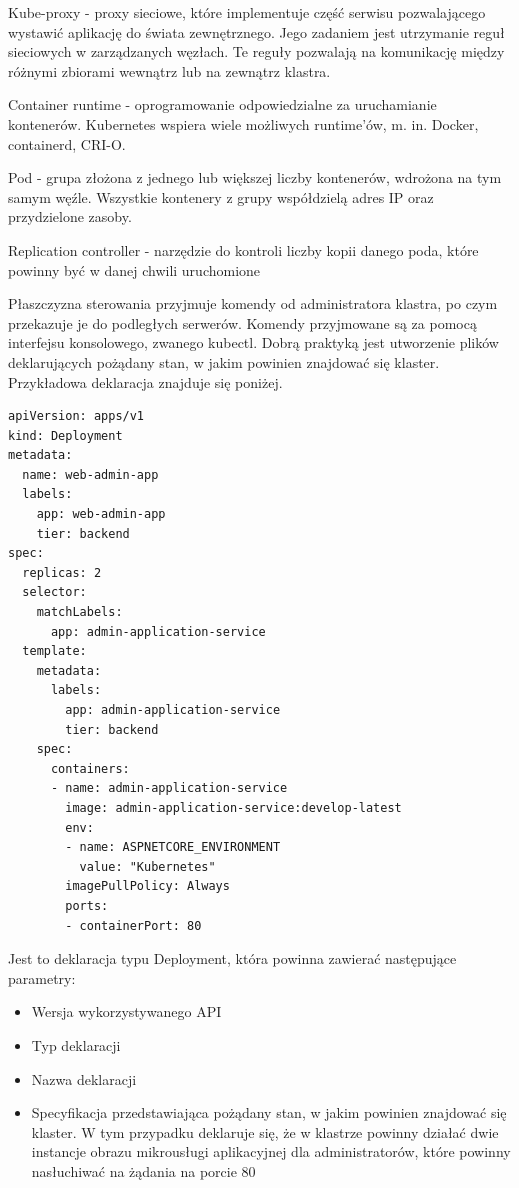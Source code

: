 \documentclass[11pt, a4]{article} %
\begin{document}
Kube-proxy - proxy sieciowe, które implementuje część serwisu pozwalającego wystawić 
aplikację do świata zewnętrznego. Jego zadaniem jest utrzymanie reguł sieciowych 
w zarządzanych węzłach. Te reguły pozwalają na komunikację między różnymi zbiorami 
wewnątrz lub na zewnątrz klastra.

Container runtime - oprogramowanie odpowiedzialne za uruchamianie kontenerów. 
Kubernetes wspiera wiele możliwych runtime'ów, m. in. Docker, containerd, CRI-O.

Pod - grupa złożona z jednego lub większej liczby kontenerów, wdrożona na tym samym 
węźle. Wszystkie kontenery z grupy współdzielą adres IP oraz przydzielone zasoby.

Replication controller - narzędzie do kontroli liczby kopii danego poda, które powinny 
być w danej chwili uruchomione

Płaszczyzna sterowania przyjmuje komendy od administratora klastra, po czym przekazuje 
je do podległych serwerów. Komendy przyjmowane są za pomocą interfejsu 
konsolowego, zwanego kubectl. Dobrą praktyką jest utworzenie plików deklarujących 
pożądany stan, w jakim powinien znajdować się klaster. Przykładowa deklaracja znajduje 
się poniżej.

\begin{lstlisting}
apiVersion: apps/v1
kind: Deployment
metadata:
  name: web-admin-app
  labels:
    app: web-admin-app
    tier: backend
spec:
  replicas: 2
  selector:
    matchLabels:
      app: admin-application-service
  template:
    metadata:
      labels:
        app: admin-application-service
        tier: backend
    spec:
      containers:
      - name: admin-application-service
        image: admin-application-service:develop-latest
        env:
        - name: ASPNETCORE_ENVIRONMENT
          value: "Kubernetes"
        imagePullPolicy: Always
        ports:
        - containerPort: 80

\end{lstlisting}

Jest to deklaracja typu Deployment, która powinna zawierać następujące parametry:

\begin{itemize} %
    \item Wersja wykorzystywanego API
    \item Typ deklaracji
    \item Nazwa deklaracji
    \item Specyfikacja przedstawiająca pożądany stan, w jakim powinien znajdować się 
    klaster. W tym przypadku deklaruje się, że w klastrze powinny działać dwie 
    instancje obrazu mikrousługi aplikacyjnej dla administratorów, które powinny 
    nasłuchiwać na żądania na porcie 80
\end{itemize}
\end{document}
